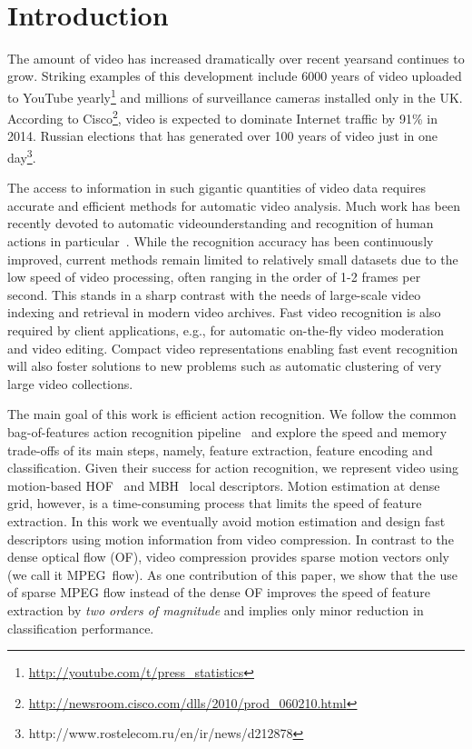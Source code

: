 \documentclass[10pt,twocolumn,letterpaper]{article}
\begin{document}

\mbox{}\vspace{-1.3cm}\\
\section{Introduction}

The amount of video has increased dramatically over recent yearsand continues to grow. Striking examples of this development
include 6000 years of video uploaded to YouTube
yearly\footnote{\scriptsize
\url{http://youtube.com/t/press\_statistics}} and millions of
surveillance cameras installed only in the UK. According to
Cisco\footnote{\scriptsize
\url{http://newsroom.cisco.com/dlls/2010/prod_060210.html}},
video is expected to dominate Internet traffic by 91\% in 2014.
Russian elections that has generated over 100 years of video
just in one
day\footnote{http://www.rostelecom.ru/en/ir/news/d212878}.

The access to information in such gigantic quantities of video
data requires accurate and efficient methods for automatic video analysis. Much work has been recently devoted to automatic videounderstanding and recognition of human actions in
particular~\cite{Laptev08,Liu11,Niebles10,Sadanand12,Schuldt04,Wang12}.
While the recognition accuracy has been continuously improved,
current methods remain limited to relatively small datasets due
to the low speed of video processing, often ranging in the order of 1-2 frames per second. This stands in a sharp contrast with
the needs of large-scale video indexing and retrieval in modern
video archives. Fast video recognition is also required by
client applications, e.g., for automatic on-the-fly video
moderation and video editing. Compact video representations
enabling fast event recognition will also foster solutions to
new problems such as automatic clustering of very large video
collections.

The main goal of this work is efficient action recognition. We
follow the common bag-of-features action recognition
pipeline~\cite{Laptev08,Schuldt04,Wang12} and explore the speed
and memory trade-offs of its main steps, namely, feature
extraction, feature encoding and classification. Given their
success for action recognition, we represent video
using motion-based HOF~\cite{Laptev08} and MBH~\cite{Wang12}
local descriptors. Motion estimation at dense grid, however, is
a time-consuming process that
limits the speed of feature extraction.
In this work we eventually avoid motion estimation and design
fast
descriptors using motion information from video compression.
In contrast to the dense optical flow (OF), video compression
provides sparse motion vectors only (we call it MPEG~flow).
As one contribution of this paper, we show that the use of
sparse MPEG flow instead of the dense OF improves the speed of
feature extraction by {\em two orders of magnitude} and implies
only minor reduction in classification performance.
\end{document}
